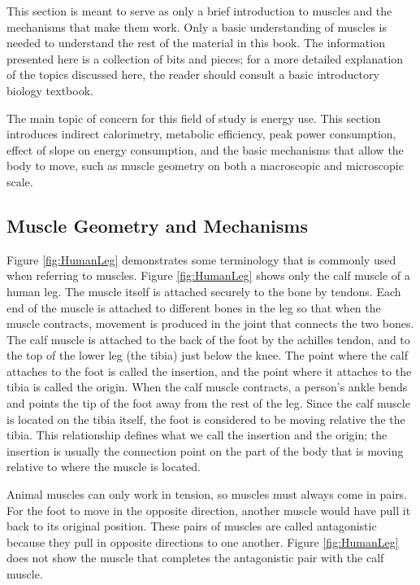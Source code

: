 This section is meant to serve as only a brief introduction to muscles and the mechanisms that make them work. Only a basic understanding of muscles is needed to understand the rest of the material in this book. The information presented here is a collection of bits and pieces; for a more detailed explanation of the topics discussed here, the reader should consult a basic introductory biology textbook. 

The main topic of concern for this field of study is energy use. This section introduces indirect calorimetry, metabolic efficiency, peak power consumption, effect of slope on energy consumption, and the basic mechanisms that allow the body to move, such as muscle geometry on both a macroscopic and microscopic scale. 

\subsection{Muscle Geometry and Mechanisms}

Figure \ref{fig:HumanLeg} demonstrates some terminology that is commonly used when referring to muscles. Figure \ref{fig:HumanLeg} shows only the calf muscle of a human leg. The muscle itself is attached securely to the bone by tendons. Each end of the muscle is attached to different bones in the leg so that when the muscle contracts, movement is produced in the joint that connects the two bones. The calf muscle is attached to the back of the foot by the achilles tendon, and to the top of the lower leg (the tibia) just below the knee. The point where the calf attaches to the foot is called the insertion, and the point where it attaches to the tibia is called the origin. When the calf muscle contracts, a person's ankle bends and points the tip of the foot away from the rest of the leg. Since the calf muscle is located on the tibia itself, the foot is considered to be moving relative the the tibia. This relationship defines what we call the insertion and the origin; the insertion is usually the connection point on the part of the body that is moving relative to where the muscle is located. 

Animal muscles can only work in tension, so muscles must always come in pairs. For the foot to move in the opposite direction, another muscle would have pull it back to its original position. These pairs of muscles are called antagonistic because they pull in opposite directions to one another.  Figure \ref{fig:HumanLeg} does not show the muscle that completes the antagonistic pair with the calf muscle. 

